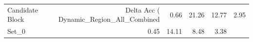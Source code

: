 \begin{tabular}{lrrrr}
\toprule
Candidate Block & Delta Acc (%
\midrule
Dynamic_Region_All_Combined & 0.66 & 21.26 & 12.77 & 2.95 \\
Set_0 & 0.45 & 14.11 & 8.48 & 3.38 \\
\bottomrule
\end{tabular}
